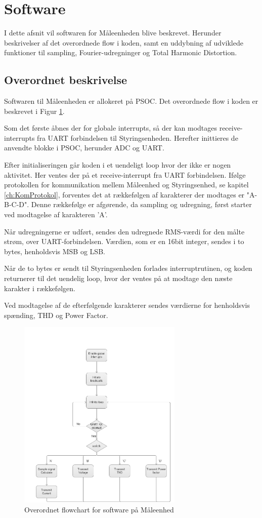 
\section{Software}

I dette afsnit vil softwaren for Måleenheden blive beskrevet. Herunder beskrivelser af det overordnede flow i koden, samt en uddybning af udviklede funktioner til sampling, Fourier-udregninger og Total Harmonic Distortion. 

\subsection{Overordnet beskrivelse}

Softwaren til Måleenheden er allokeret på PSOC. Det overordnede flow i koden er beskrevet i Figur \ref{fig:MEflowchart}. 

Som det første åbnes der for globale interrupts, så der kan modtages receive-interrupts fra UART forbindelsen til Styringsenheden. Herefter inittieres de anvendte blokke i PSOC, herunder ADC og UART. 

Efter initialiseringen går koden i et uendeligt loop hvor der ikke er nogen aktivitet.  Her ventes der på et receive-interrupt fra UART forbindelsen. Ifølge protokollen for kommunikation mellem Måleenhed og Styringsenhed, se kapitel \ref{ch:KomProtokol}, forventes det at rækkefølgen af karakterer der modtages er "A-B-C-D". Denne rækkefølge er afgørende, da sampling og udregning, først starter ved modtagelse af karakteren 'A'. 

Når udregningerne er udført, sendes den udregnede RMS-værdi for den målte strøm, over UART-forbindelsen. Værdien, som er en 16bit integer, sendes i to bytes, henholdsvis MSB og LSB. 

Når de to bytes er sendt til Styringsenheden forlades interruptrutinen, og koden returnerer til det uendelig loop, hvor der ventes på at modtage den næste karakter i rækkefølgen. 

Ved modtagelse af de efterfølgende karakterer sendes værdierne for henholdsvis spænding, THD og Power Factor. 


\begin{figure}[H] %
	\centering
	\includegraphics[width=0.7\textwidth]{Figure/MEflowchart.png}
	\caption{Overordnet flowchart for software på Måleenhed}
	\label{fig:MEflowchart}
\end{figure}

